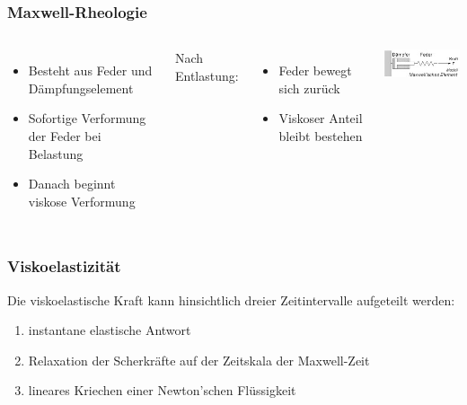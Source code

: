 \documentclass{beamer}
\begin{document}
\begin{frame}
\frametitle{Maxwell-Rheologie}
 \begin{columns}
 \begin{itemize}
 	\item Besteht aus Feder und Dämpfungselement
 	\item Sofortige Verformung der Feder bei Belastung
 	\item Danach beginnt viskose Verformung
 \end{itemize}
Nach Entlastung:
\begin{itemize}
	\item Feder bewegt sich zurück
	\item Viskoser Anteil bleibt bestehen
\end{itemize}
\includegraphics[scale=1]{images.jpg}
\end{columns}
\end{frame}
	

 \begin{frame}
 \frametitle{Viskoelastizität}
 Die viskoelastische Kraft kann hinsichtlich dreier Zeitintervalle aufgeteilt werden:
 \begin{enumerate}
 	\item instantane elastische Antwort
 	\item Relaxation der Scherkräfte auf der Zeitskala der Maxwell-Zeit
 	\item lineares Kriechen einer Newton'schen Flüssigkeit
 \end{enumerate}

\end{frame}

\end{document}
